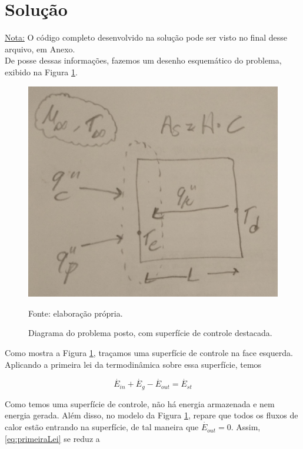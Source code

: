 \documentclass[12pt]{scrartcl}
\begin{document}
\section{Solução}

\underline{Nota:} O código completo desenvolvido na solução pode ser visto no final desse arquivo, em Anexo. \\

De posse dessas informações, fazemos um desenho esquemático do problema, exibido na
Figura \ref{fig:problemaplaca}.

\begin{figure}[h!]
    \caption{Diagrama do problema posto, com superfície de controle destacada.}
    \label{fig:problemaplaca}
    \centering
    \includegraphics[scale=0.18]{esquematico.jpeg}
    \par{Fonte: elaboração própria.}
\end{figure}

Como mostra a Figura \ref{fig:problemaplaca}, traçamos uma superfície de controle na
face esquerda. Aplicando a primeira lei da termodinâmica sobre essa superfície, temos

\begin{equation}\label{eq:primeiraLei}
    \overset{\cdot}{E}_{in} + \overset{\cdot}{E}_{g} - \overset{\cdot}{E}_{out} = \overset{\cdot}{E}_{st}
\end{equation}

Como temos uma superfície de controle, não há energia armazenada e nem energia gerada. Além disso, no modelo
da Figura \ref*{fig:problemaplaca}, repare que todos os fluxos de calor estão entrando na superfície, de tal
maneira que $\overset{\cdot}{E}_{out} = 0$. Assim, \eqref{eq:primeiraLei} se reduz a
\end{document}
